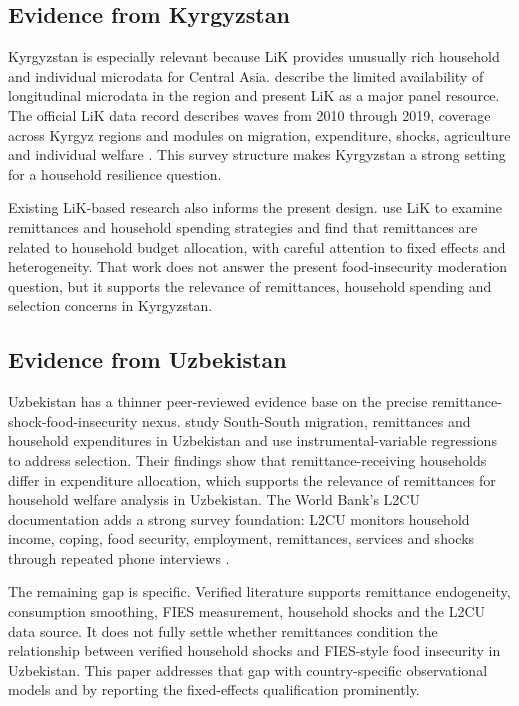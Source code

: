 \documentclass[11pt]{article}
\begin{document}
\subsection{Evidence from Kyrgyzstan}

Kyrgyzstan is especially relevant because LiK provides unusually rich household and individual microdata for Central Asia. \textcite{Brueck2014} describe the limited availability of longitudinal microdata in the region and present LiK as a major panel resource. The official LiK data record describes waves from 2010 through 2019, coverage across Kyrgyz regions and modules on migration, expenditure, shocks, agriculture and individual welfare \parencite{LIK2023}. This survey structure makes Kyrgyzstan a strong setting for a household resilience question.

Existing LiK-based research also informs the present design. \textcite{Wang2021} use LiK to examine remittances and household spending strategies and find that remittances are related to household budget allocation, with careful attention to fixed effects and heterogeneity. That work does not answer the present food-insecurity moderation question, but it supports the relevance of remittances, household spending and selection concerns in Kyrgyzstan.

\subsection{Evidence from Uzbekistan}

Uzbekistan has a thinner peer-reviewed evidence base on the precise remittance-shock-food-insecurity nexus. \textcite{Kakhkharov2021} study South-South migration, remittances and household expenditures in Uzbekistan and use instrumental-variable regressions to address selection. Their findings show that remittance-receiving households differ in expenditure allocation, which supports the relevance of remittances for household welfare analysis in Uzbekistan. The World Bank's L2CU documentation adds a strong survey foundation: L2CU monitors household income, coping, food security, employment, remittances, services and shocks through repeated phone interviews \parencite{WorldBank2025a,WorldBank2025b,Uochi2025}.

The remaining gap is specific. Verified literature supports remittance endogeneity, consumption smoothing, FIES measurement, household shocks and the L2CU data source. It does not fully settle whether remittances condition the relationship between verified household shocks and FIES-style food insecurity in Uzbekistan. This paper addresses that gap with country-specific observational models and by reporting the fixed-effects qualification prominently.
\end{document}
